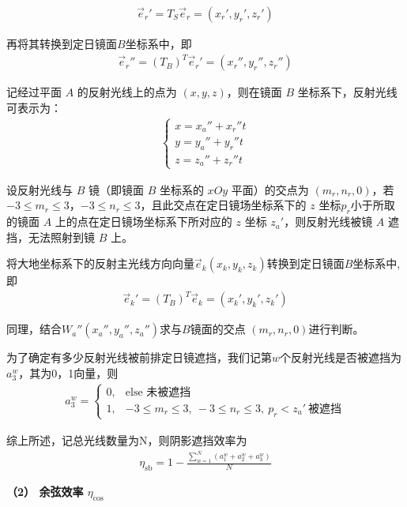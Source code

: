 \documentclass[../main.tex]{subfiles}
\begin{document}
\begin{align}    \label{1.32}
\vec{e}_r'=T_S\vec{e}_r=\left( x_r',y_r',z_r' \right) 
\end{align}
\par 再将其转换到定日镜面$B$坐标系中，即
\begin{align} \label{1.33}
  \vec{e}_r'' = (T_B)^T \vec{e}_r' = (x_r'', y_r'', z_r'')
\end{align}
 \par 记经过平面 $A$ 的反射光线上的点为 $(x, y, z)$，则在镜面 $B$ 坐标系下，反射光线可表示为：
\begin{align} \label{1.34}
 \begin{cases}
x = x_a'' + x_r'' t \\
y = y_a'' + y_r'' t \\
z = z_a'' + z_r'' t
\end{cases}
\end{align}
\par 设反射光线与 $B$ 镜（即镜面 $B$ 坐标系的 $xOy$ 平面）的交点为 $(m_r, n_r, 0)$，若 $-3 \leq m_r \leq 3$，$-3 \leq n_r \leq 3$，且此交点在定日镜场坐标系下的 $z$ 坐标$p_r$小于所取的镜面 $A$ 上的点在定日镜场坐标系下所对应的 $z$ 坐标 $z_a'$，则反射光线被镜 \( A \) 遮挡，无法照射到镜 \( B \) 上。
\par 将大地坐标系下的反射主光线方向向量$\vec{e}_k (x_k, y_k, z_k)$转换到定日镜面$B$坐标系中,即
\begin{align}    \label{1.32}
\vec{e}_k'=(T_B)^T\vec{e}_k=\left( x_k',y_k',z_k' \right) 
\end{align}
\par 同理，结合$ W_a''(x_a'', y_a'', z_a'')$求与$B$镜面的交点 $(m_r, n_r, 0)$进行判断。
\par 为了确定有多少反射光线被前排定日镜遮挡，我们记第$w$个反射光线是否被遮挡为$a_3^w$，其为0，1向量，则
\begin{align}    \label{1.33}
a_3^w = 
\begin{cases} 
0, & \text{else 未被遮挡} \\
1, & -3 \leq m_r \leq 3,\ -3 \leq n_r\leq 3,\ p_r < z_a'\ \text{被遮挡} 
\end{cases}
 \end{align}
\par 综上所述，记总光线数量为N，则阴影遮挡效率为
\begin{align}\label{1.34}
 \eta _{\text{sb}}=1-\frac{\sum_{w=1}^N{\left( a_{1}^{w}+a_{2}^{w}+a_{3}^{w} \right)}}{N}
\end{align}
\par \textbf{（2） 余弦效率 $\eta_{\text{cos}}$}
\end{document}
